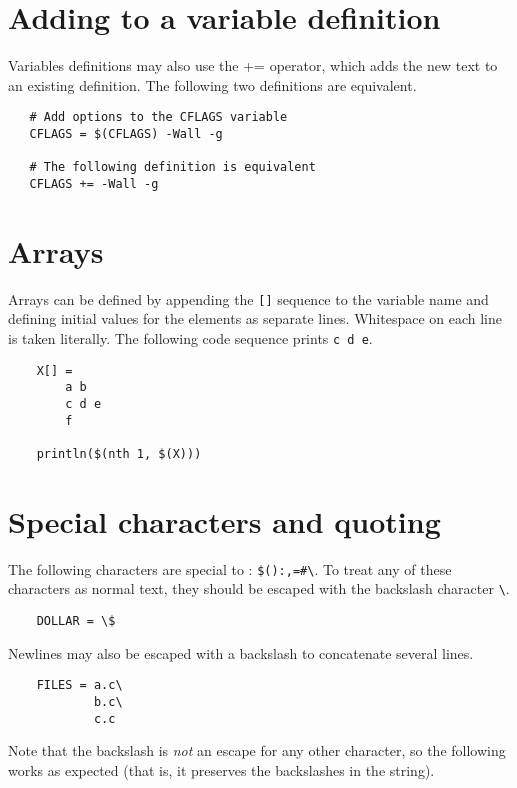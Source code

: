 \section{Adding to a variable definition}

Variables definitions may also use the += operator, which adds the new text to an existing
definition.  The following two definitions are equivalent.

\begin{verbatim}
   # Add options to the CFLAGS variable
   CFLAGS = $(CFLAGS) -Wall -g

   # The following definition is equivalent
   CFLAGS += -Wall -g
\end{verbatim}

\section{Arrays}

Arrays can be defined by appending the \verb+[]+ sequence to the variable name and defining initial
values for the elements as separate lines.  Whitespace on each line is
taken literally.  The following code sequence prints \verb+c d e+.

\begin{verbatim}
    X[] =
        a b
        c d e
        f

    println($(nth 1, $(X)))
\end{verbatim}

\section{Special characters and quoting}

The following characters are special to : \verb+$():,=#\+.  To treat
any of these characters as normal text, they should be escaped with the backslash
character \verb+\+.

\begin{verbatim}
    DOLLAR = \$
\end{verbatim}

Newlines may also be escaped with a backslash to concatenate several lines.

\begin{verbatim}
    FILES = a.c\
            b.c\
            c.c
\end{verbatim}

Note that the backslash is \emph{not} an escape for any other character, so the following
works as expected (that is, it preserves the backslashes in the string).

